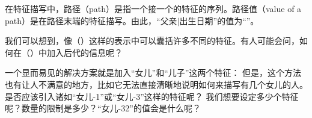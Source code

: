 在特征描写中，路径（path）是指一个接一个的特征的序列。路径值（value of a path）是在路径末端的特征描写。由此，“\textsc{父亲$|$出生日期}”的值为“”。

我们可以想到，像（）这样的表示中可以囊括许多不同的特征。有人可能会问，如何在（）中加入后代的信息呢？

一个显而易见的解决方案就是加入“\textsc{女儿}”和“\textsc{儿子}”这两个特征：
\ea
{}
\z
但是，这个方法也有让人不满意的地方，比如它无法直接清晰地说明如何来描写有几个女儿的人。是否应该引入诸如“\textsc{女儿-1}”或“\textsc{女儿-3}”这样的特征呢？
\ea
{}
\z
我们想要设定多少个特征呢？数量的限制是多少？“\textsc{女儿-32}”的值会是什么呢？

